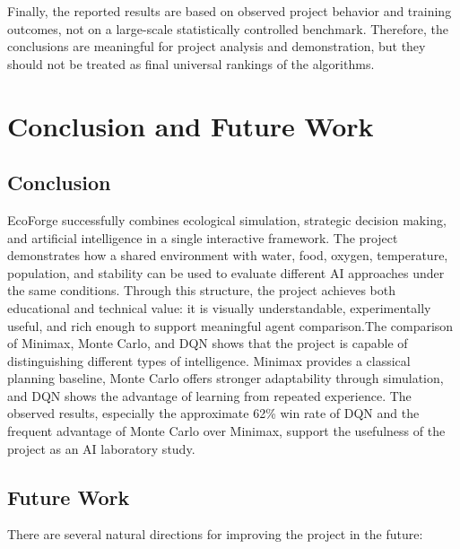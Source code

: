 \documentclass[12pt,a4paper]{article}
\begin{document}
Finally, the reported results are based on observed project behavior and training outcomes, not on a large-scale statistically controlled benchmark. Therefore, the conclusions are meaningful for project analysis and demonstration, but they should not be treated as final universal rankings of the algorithms.

\clearpage
\section{Conclusion and Future Work}

\subsection{Conclusion}

EcoForge successfully combines ecological simulation, strategic decision making, and artificial intelligence in a single interactive framework. The project demonstrates how a shared environment with water, food, oxygen, temperature, population, and stability can be used to evaluate different AI approaches under the same conditions. Through this structure, the project achieves both educational and technical value: it is visually understandable, experimentally useful, and rich enough to support meaningful agent comparison.The comparison of Minimax, Monte Carlo, and DQN shows that the project is capable of distinguishing different types of intelligence. Minimax provides a classical planning baseline, Monte Carlo offers stronger adaptability through simulation, and DQN shows the advantage of learning from repeated experience. The observed results, especially the approximate 62\% win rate of DQN and the frequent advantage of Monte Carlo over Minimax, support the usefulness of the project as an AI laboratory study.

\subsection{Future Work}

There are several natural directions for improving the project in the future:
\end{document}
